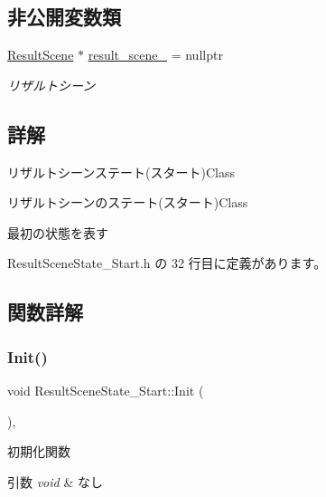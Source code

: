 \subsection*{非公開変数類}
\begin{DoxyCompactItemize}
\item 
\mbox{\hyperlink{class_result_scene}{Result\+Scene}} $\ast$ \mbox{\hyperlink{class_result_scene_state___start_a223a52e93231e460dad3401a1a49931d}{result\+\_\+scene\+\_\+}} = nullptr
\begin{DoxyCompactList}\small\item\em リザルトシーン \end{DoxyCompactList}\end{DoxyCompactItemize}


\subsection{詳解}
リザルトシーンステート(スタート)Class 

リザルトシーンのステート(スタート)Class

最初の状態を表す 

 Result\+Scene\+State\+\_\+\+Start.\+h の 32 行目に定義があります。



\subsection{関数詳解}
\mbox{\label{class_result_scene_state___start_a615c7e05efd2320b8956c5fd94398f55}} 
\subsubsection{\texorpdfstring{Init()}{Init()}}
{\footnotesize\ttfamily void Result\+Scene\+State\+\_\+\+Start\+::\+Init (\begin{DoxyParamCaption}{ }\end{DoxyParamCaption})\hspace{0.3cm}{\ttfamily [override]}, {\ttfamily [virtual]}}



初期化関数 


\begin{DoxyParams}{引数}
{\em void} & なし \\
\hline
\end{DoxyParams}

